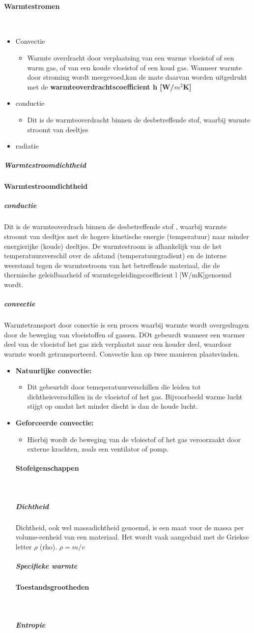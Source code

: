 \documentclass[12pt]{article}
\newcommand{\myparagraph}[1]{\paragraph{#1}\mbox{}\\}
\begin{document}
\myparagraph{Warmtestromen}
\begin{itemize}
    \item Convectie\begin{itemize}
        \item Warmte overdracht door verplaatsing van een warme vloeistof of een warm gas, of van een koude vloeistof of een koud gas. Wanneer warmte  door stroming wordt meegevoed,kan de mate daarvan worden uitgedrukt met de \textbf{warmteoverdrachtscoefficient h [W/$m^2$K]}
    \end{itemize}
    \item conductie\begin{itemize}
        \item Dit is de warmteoverdracht binnen de desbetreffende stof, waarbij warmte stroomt van deeltjes 
    \end{itemize}
    \item radiatie
\end{itemize}
\subparagraph{Warmtestroomdichtheid}
\textbf{Warmtestroomdichtheid}
\subparagraph{conductie}
Dit is de warmteoverdrach binnen de desbetreffende stof , waarbij warmte stroomt van deeltjes met de hogere kinetische energie (temperatuur) naar minder energierijke (koude) deeltjes. De warmtestroom is afhankelijk van de het temperatuursverschil over de afstand (temperatuurgradient) en de interne weerstand tegen de warmtestroom van het betreffende materiaal, die de thermische geleidbaarheid of warmtegeleidingscoefficient l [W/mK]genoemd wordt.
\subparagraph{convectie}
Warmtetransport door conectie is een proces waarbij warmte wordt overgedragen door de beweging van vloeistoffen of gassen. DOt gebeurdt wanneer een warmer deel van de vloeistof het gas zich verplaatst naar een kouder deel, waardoor warmte wordt getransporteerd. Convectie kan op twee manieren plaatsvinden.

\begin{itemize}
    \item \textbf{Natuurlijke convectie:}\begin{itemize}
        \item Dit gebeurtdt door temeperatuurverschillen die leiden tot dichtheisverschillen in de vloeistof of het gas. Bijvoorbeeld warme lucht stijgt op omdat het minder discht is dan de houde lucht.
    \end{itemize}
    \item \textbf{Geforceerde convectie:}\begin{itemize}
        \item Hierbij wordt de beweging van de vloiestof of het gas veroorzaakt door externe krachten, zoals een ventilator of pomp.
    \end{itemize}
\myparagraph{Stofeigenschappen}
\subparagraph{Dichtheid}
Dichtheid, ook wel massadichtheid genoemd, is een maat voor de massa per volume-eenheid van een materiaal. Het wordt vaak aangeduid met de Griekse letter $\rho$ (rho).
$\rho=m/v$
\subparagraph{Specifieke warmte}
\myparagraph{Toestandsgrootheden}
\subparagraph{Entropie}
\end{itemize}
\end{document}

